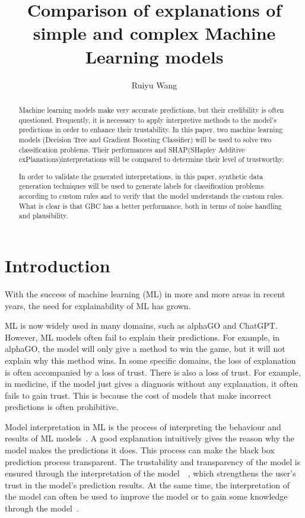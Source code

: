 \documentclass[runningheads,a4paper]{llncs}
\title{Comparison of explanations of simple and complex Machine Learning models}
\author{Ruiyu Wang}
\institute{MSc in Advanced Computer Science, \\ School of Computing Science,
        University of Newcastle, U. K. \\
        \email{r.wang57@ncl.ac.uk}
}
\begin{document}
\maketitle

\begin{abstract}
Machine learning models make very accurate predictions, but their credibility is often questioned. Frequently, it is necessary to apply interpretive methods to the model's predictions in order to enhance their trustability. In this paper, two machine learning models (Decision Tree and Gradient Boosting Classifier) will be used to solve two classification problems. Their performances and SHAP(SHapley Additive exPlanations)interpretations will be compared to determine their level of trustworthy. 

In order to validate the generated interpretations, in this paper, synthetic data generation techniques will be used to generate labels for classification problems according to custom rules and to verify that the model understands the custom rules. What is clear is that GBC has a better performance, both in terms of noise handling and plausibility.
\end{abstract}

\section{Introduction}

With the success of machine learning (ML) in more and more areas in recent years, the need for explainability of ML has grown.

ML is now widely used in many domains, such as alphaGO and ChatGPT.
However, ML models often fail to explain their predictions. For example,  in alphaGO, the model will only give a method to win the game, but it will not explain why this method wins.
In some specific domains, the loss of explanation is often accompanied by a loss of trust.
There is also a loss of trust. 
For example, in medicine, if the model just gives a diagnosis without any explanation, it often fails to gain trust. This is because the cost of models that make incorrect predictions is often prohibitive.

Model interpretation in ML is the process of interpreting the behaviour and results of ML models~\cite{doshivelez2017rigorous}.
A good explanation intuitively gives the reason why the model makes the predictions it does.
This process can make the black box prediction process transparent.\cite{8466590}
The trustability and transparency of the model is ensured through the interpretation of the model~\cite{arrieta2020explainable}~\cite{Molnar2020}, which strengthens the user's trust in the model's prediction results.
At the same time, the interpretation of the model can often be used to improve the model or to gain some knowledge through the model~\cite{8466590}.
\end{document}
